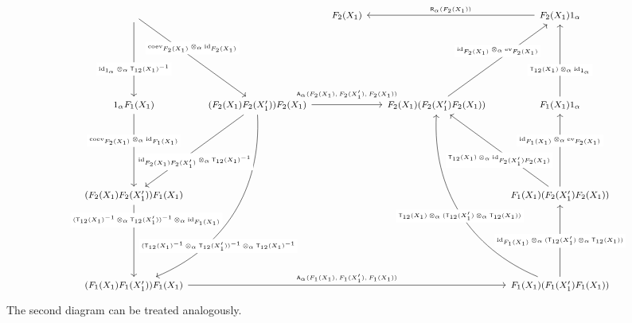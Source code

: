 \begin{prf}
\begin{enumerate}
\begin{equation*}
\begin{tikzcd}[row sep=6.5em,column sep=1.4em,font=\footnotesize,every label/.append style={font=\tiny}]
  \ar{rd}[description,yshift=3mm]{\mathrm{coev}_{F_{2}(X_{1})} \otimes_{\alpha} \mathrm{id}_{F_{2}(X_{1})}}
  \ar{d}[description,yshift=-3mm]{\mathrm{id}_{1_{\alpha}} \otimes_{\alpha} \mathsf{T}_{12}(X_{1})^{-1}}
  &
  &
  F_{2}(X_{1})
  &
  &
  F_{2}(X_{1}) 1_{\alpha}
  \ar{ll}[swap]{\mathsf{R}_{\alpha}(F_{2}(X_{1}))}
  \\
  1_{\alpha} F_{1}(X_{1})
  \ar{d}[description,yshift=3mm]{\mathrm{coev}_{F_{2}(X_{1})} \otimes_{\alpha} \mathrm{id}_{F_{1}(X_{1})}}
  &
  (F_{2}(X_{1}) F_{2}(X_{1}^{\prime})) F_{2}(X_{1})
  \ar{rr}[yshift=3pt]{\mathsf{A}_{\alpha}(F_{2}(X_{1}),F_{2}(X_{1}^{\prime}),F_{2}(X_{1}))}
  \ar[bend left=35]{ddl}[description,xshift=-5mm,yshift=-10.5mm]{(\mathsf{T}_{12}(X_{1})^{-1} \otimes_{\alpha} \mathsf{T}_{12}(X_{1}^{\prime}))^{-1} \otimes_{\alpha} \mathsf{T}_{12}(X_{1})^{-1}}
  \ar{dl}[description,yshift=-3.5mm]{\mathrm{id}_{F_{2}(X_{1}) F_{2}(X_{1}^{\prime})} \otimes_{\alpha} \mathsf{T}_{12}(X_{1})^{-1}}
  &
  &
  F_{2}(X_{1}) (F_{2}(X_{1}^{\prime}) F_{2}(X_{1}))
  \ar{ur}[description,yshift=3mm]{\mathrm{id}_{F_{2}(X_{1})} \otimes_{\alpha} \mathrm{ev}_{F_{2}(X_{1})}}
  &
  F_{1}(X_{1}) 1_{\alpha}
  \ar{u}[description,yshift=-3mm]{\mathsf{T}_{12}(X_{1}) \otimes_{\alpha} \mathrm{id}_{1_{\alpha}}}
  \\
  (F_{2}(X_{1}) F_{2}(X_{1}^{\prime})) F_{1}(X_{1})
  \ar{d}[description,xshift=4mm,yshift=6.5mm]{(\mathsf{T}_{12}(X_{1})^{-1} \otimes_{\alpha} \mathsf{T}_{12}(X_{1}^{\prime}))^{-1} \otimes_{\alpha} \mathrm{id}_{F_{1}(X_{1})}}
  &
  &
  &
  &
  F_{1}(X_{1}) (F_{2}(X_{1}^{\prime}) F_{2}(X_{1}))
  \ar{u}[description,yshift=3mm]{\mathrm{id}_{F_{1}(X_{1})} \otimes_{\alpha} \mathrm{ev}_{F_{2}(X_{1})}}
  \ar{ul}[description,yshift=-3mm]{\mathsf{T}_{12}(X_{1}) \otimes_{\alpha} \mathrm{id}_{F_{2}(X_{1}^{\prime}) F_{2}(X_{1})}}
  \\
  (F_{1}(X_{1}) F_{1}(X_{1}^{\prime})) F_{1}(X_{1})
  \ar{rrrr}{\mathsf{A}_{\alpha}(F_{1}(X_{1}),F_{1}(X_{1}^{\prime}),F_{1}(X_{1}))}
  &
  &
  &
  &
  F_{1}(X_{1}) (F_{1}(X_{1}^{\prime}) F_{1}(X_{1}))
  \ar{u}[description]{\mathrm{id}_{F_{1}(X_{1})} \otimes_{\alpha} (\mathsf{T}_{12}(X_{1}^{\prime}) \otimes_{\alpha} \mathsf{T}_{12}(X_{1}))}
  \ar[bend left=35]{uul}[description,yshift=-1mm]{\mathsf{T}_{12}(X_{1}) \otimes_{\alpha} (\mathsf{T}_{12}(X_{1}^{\prime}) \otimes_{\alpha} \mathsf{T}_{12}(X_{1}))}
\end{tikzcd}
\end{equation*}
The second diagram can be treated analogously.


\end{enumerate}
\end{prf}
